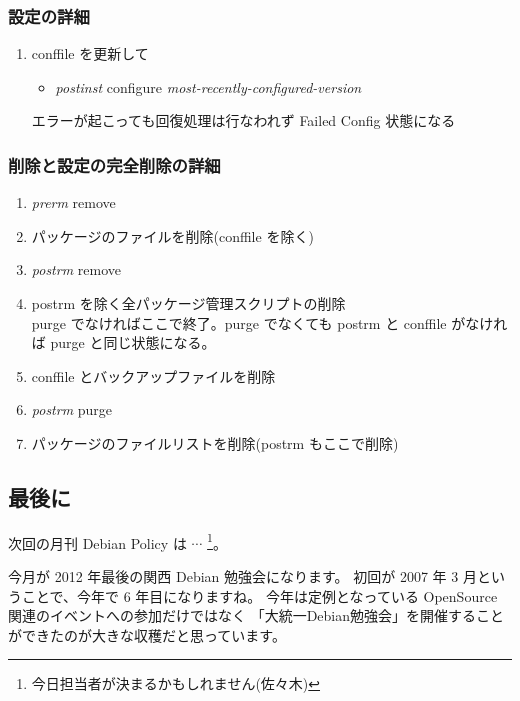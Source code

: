 \documentclass[mingoth,a4paper]{jsarticle}
\begin{document}
\subsubsection{設定の詳細}
\begin{enumerate}
\item conffile を更新して
  \begin{itemize}
  \item {\it postinst} configure {\it most-recently-configured-version}
  \end{itemize}
  エラーが起こっても回復処理は行なわれず Failed Config 状態になる
\end{enumerate}


\subsubsection{削除と設定の完全削除の詳細}
\begin{enumerate}
\item {\it prerm} remove

\item パッケージのファイルを削除(conffile を除く)

\item {\it postrm} remove

\item postrm を除く全パッケージ管理スクリプトの削除\\
  purge でなければここで終了。purge でなくても postrm と conffile がなければ purge と同じ状態になる。

\item conffile とバックアップファイルを削除

\item {\it postrm} purge

\item パッケージのファイルリストを削除(postrm もここで削除)

\end{enumerate}


\subsection{最後に}
次回の月刊 Debian Policy は $\cdots$
\footnote{今日担当者が決まるかもしれません(佐々木)}。

\clearpage


今月が 2012 年最後の関西 Debian 勉強会になります。
初回が 2007 年 3 月ということで、今年で 6 年目になりますね。
今年は定例となっている OpenSource 関連のイベントへの参加だけではなく
「大統一Debian勉強会」を開催することができたのが大きな収穫だと思っています。
\end{document}
